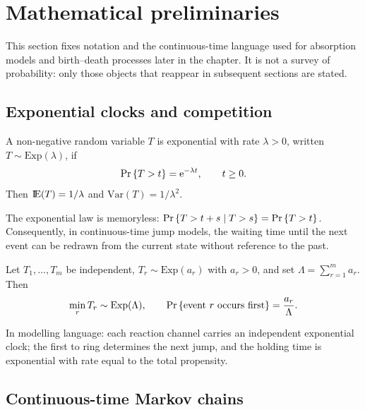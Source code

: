 \section{Mathematical preliminaries}
\label{sec:prelim}

This section fixes notation and the continuous-time language used for absorption models and birth--death processes later in the chapter. It is not a survey of probability: only those objects that reappear in subsequent sections are stated.

\subsection{Exponential clocks and competition}
\label{sec:exp}

\begin{definition}
A non-negative random variable \(T\) is exponential with rate \(\lambda>0\), written \(T\sim\mathrm{Exp}(\lambda)\), if
\begin{equation*}
{\text{Pr}\left\{T>t\right\}}={\rm e}^{-\lambda t},\qquad t\ge0.
\end{equation*}
Then \({\rm I}\!{\rm E}(T)=1/\lambda\) and \(\mathrm{Var}(T)=1/\lambda^2\).
\end{definition}

The exponential law is memoryless: \({\text{Pr}\left\{T>t+s\mid T>s\right\}}={\text{Pr}\left\{T>t\right\}}\). Consequently, in continuous-time jump models, the waiting time until the next event can be redrawn from the current state without reference to the past.

\begin{proposition}
\label{prop:race}
Let \(T_1,\dots,T_m\) be independent, \(T_r\sim\mathrm{Exp}(a_r)\) with \(a_r>0\), and set \(\Lambda=\sum_{r=1}^m a_r\). Then
\begin{equation*}
\min_r T_r\sim\mathrm{Exp}(\Lambda),
\qquad
{\text{Pr}\left\{\text{event \(r\) occurs first}\right\}}=\frac{a_r}{\Lambda}.
\end{equation*}
\end{proposition}

In modelling language: each reaction channel carries an independent exponential clock; the first to ring determines the next jump, and the holding time is exponential with rate equal to the total propensity.

\subsection{Continuous-time Markov chains}
\label{sec:ctmc}

